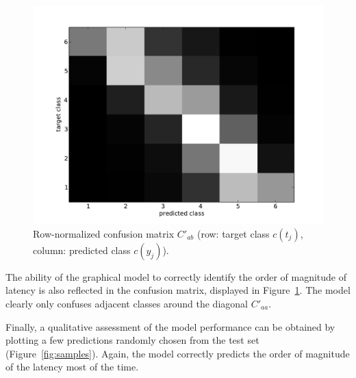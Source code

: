 \documentclass[10pt,a4paper,notitlepage,twocolumn]{article}
\begin{document}
\begin{figure}[h]
\centering
\includegraphics[width=0.8\columnwidth]{full_confusion}
\caption{Row-normalized confusion matrix $C'_{ab}$ (row: target class $c(t_j)$, column: predicted class $c(y_j)$).}
\label{fig:conf}
\end{figure}


The ability of the graphical model to correctly identify the order of magnitude of latency is also reflected in the confusion matrix, displayed in Figure~\ref{fig:conf}.
The model clearly only confuses adjacent classes around the diagonal $C'_{aa}$.

Finally, a qualitative assessment of the model performance can be obtained by plotting a few predictions randomly chosen from the test set (Figure~\ref{fig:samples}).
Again, the model correctly predicts the order of magnitude of the latency most of the time.
\end{document}
